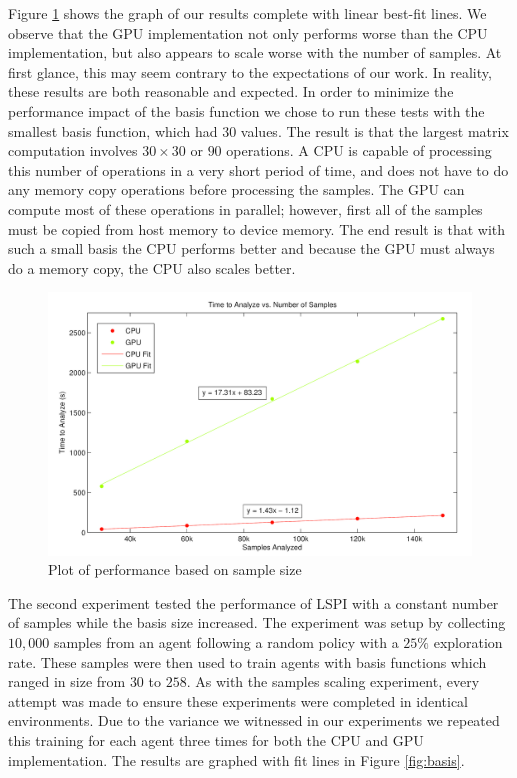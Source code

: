 Figure \ref{fig:samples} shows the graph of our results complete with linear best-fit lines. We observe that the GPU implementation not only performs worse than the CPU implementation, but also appears to scale worse with the number of samples. At first glance, this may seem contrary to the expectations of our work. In reality, these results are both reasonable and expected. In order to minimize the performance impact of the basis function we chose to run these tests with the smallest basis function, which had $30$ values. The result is that the largest matrix computation involves $30 \times 30$ or $90$ operations. A CPU is capable of processing this number of operations in a very short period of time, and does not have to do any memory copy operations before processing the samples. The GPU can compute most of these operations in parallel; however, first all of the samples must be copied from host memory to device memory. The end result is that with such a small basis the CPU performs better and because the GPU must always do a memory copy, the CPU also scales better.

\begin{figure}
	\includegraphics[width=\textwidth]{Time_vs_Samples.png}
    \caption{Plot of performance based on sample size}
	\label{fig:samples}
\end{figure}

The second experiment tested the performance of LSPI with a constant number of samples while the basis size increased. The experiment was setup by collecting $10,000$ samples from an agent following a random policy with a $25\%$ exploration rate. These samples were then used to train agents with basis functions which ranged in size from $30$ to $258$. As with the samples scaling experiment, every attempt was made to ensure these experiments were completed in identical environments. Due to the variance we witnessed in our experiments we repeated this training for each agent three times for both the CPU and GPU implementation. The results are graphed with fit lines in Figure \ref{fig:basis}.

